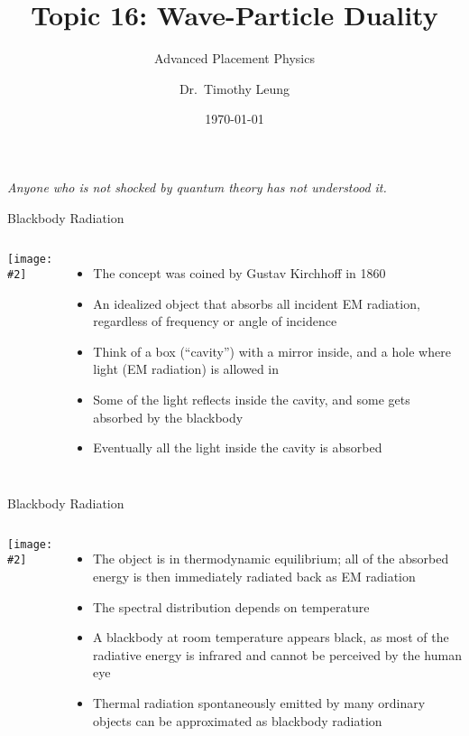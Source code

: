 \documentclass[12pt,compress,aspectratio=169]{beamer}
\title{Topic 16: Wave-Particle Duality}
\subtitle{Advanced Placement Physics}
\author[TML]{Dr.\ Timothy Leung}
\institute{Olympiads School}
\date{\today}
\newcommand{\pic}[2]{\texttt{[image: \#2]}}
\begin{document}
\begin{frame}
  \maketitle
\end{frame}


\begin{frame}{}
  \begin{center}
    \emph{Anyone who is not shocked by quantum theory has not understood it.}

    \vspace{.2in}
    \hspace{4in}{- Niels Bohr}
  \end{center}
\end{frame}



\begin{frame}{Blackbody Radiation}
  \begin{columns}
    \pic{1.1}{blackbody1}
     
    \begin{itemize}
    \item The concept was coined by Gustav Kirchhoff in 1860
    \item An idealized object that absorbs all incident EM radiation,
      regardless of frequency or angle of incidence
    \item Think of a box (``cavity'') with a mirror inside, and a hole where
      light (EM radiation) is allowed in
    \item Some of the light reflects inside the cavity, and some gets absorbed
      by the blackbody
    \item Eventually all the light inside the cavity is absorbed
    \end{itemize}
    \end{columns}
\end{frame}


\begin{frame}{Blackbody Radiation}
  \begin{columns}
    \pic{1.1}{blackbody1}
    
    \begin{itemize}
    \item The object is in thermodynamic equilibrium; all of the absorbed
      energy is then immediately radiated back as EM radiation
    \item The spectral distribution depends on temperature
    \item A blackbody at room temperature appears black, as most of the
      radiative energy is infrared and cannot be perceived by the human eye
    \item Thermal radiation spontaneously emitted by many ordinary objects can
      be approximated as blackbody radiation 
    \end{itemize}
  \end{columns}
\end{frame}
\end{document}
